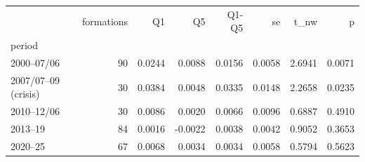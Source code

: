 \begin{tabular}{lrrrrrrr}
\toprule
 & formations & Q1 & Q5 & Q1-Q5 & se & t_nw & p \\
period &  &  &  &  &  &  &  \\
\midrule
2000–07/06 & 90 & 0.0244 & 0.0088 & 0.0156 & 0.0058 & 2.6941 & 0.0071 \\
2007/07–09 (crisis) & 30 & 0.0384 & 0.0048 & 0.0335 & 0.0148 & 2.2658 & 0.0235 \\
2010–12/06 & 30 & 0.0086 & 0.0020 & 0.0066 & 0.0096 & 0.6887 & 0.4910 \\
2013–19 & 84 & 0.0016 & -0.0022 & 0.0038 & 0.0042 & 0.9052 & 0.3653 \\
2020–25 & 67 & 0.0068 & 0.0034 & 0.0034 & 0.0058 & 0.5794 & 0.5623 \\
\bottomrule
\end{tabular}
